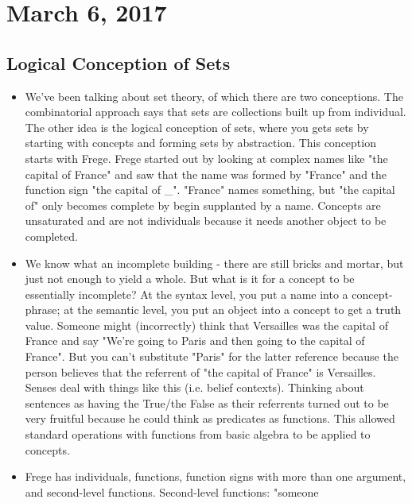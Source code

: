 \documentclass[12pt]{article}
\theoremstyle{definition}
\begin{document}
\section{March 6, 2017}

\subsection{Logical Conception of Sets}

\begin{itemize}
    \itemsep0em 
    \item
        We've been talking about set theory, of which there are two
        conceptions. The combinatorial approach says that sets are collections
        built up from individual. The other idea is the logical conception of
        sets, where you gets sets by starting with concepts and forming sets by
        abstraction. This conception starts with Frege. Frege started out by
        looking at complex names like "the capital of France" and saw that the
        name was formed by "France" and the function sign "the capital of \_".
        "France" names something, but "the capital of" only becomes complete by
        begin supplanted by a name. Concepts are unsaturated and are not
        individuals because it needs another object to be completed. 
    \item
        We know what an incomplete building - there are still bricks and
        mortar, but just not enough to yield a whole. But what is it for a
        concept to be essentially incomplete? At the syntax level, you put a
        name into a concept-phrase; at the semantic level, you put an object
        into a concept to get a truth value. Someone might (incorrectly) think
        that Versailles was the capital of France and say "We're going to Paris
        and then going to the capital of France". But you can't substitute
        "Paris" for the latter reference because the person believes that the
        referrent of "the capital of France" is Versailles. Senses deal with
        things like this (i.e. belief contexts). Thinking about sentences as
        having the True/the False as their referrents turned out to be very
        fruitful because he could think as predicates as functions. This
        allowed standard operations with functions from basic algebra to be
        applied to concepts.
    \item
        Frege has individuals, functions, function signs with more than one
        argument, and second-level functions. Second-level functions: "someone

\end{itemize}
\end{document}
